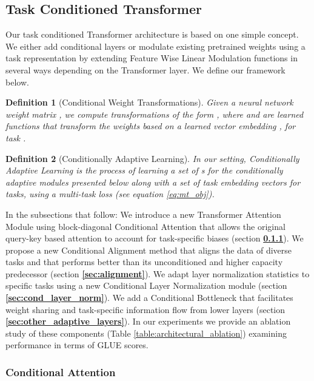 \documentclass{article} \usepackage{iclr2021_conference,times}
\newtheorem{definition}{Definition}
\begin{document}
\subsection{Task Conditioned Transformer}
\label{sec:conditional_transformer}
Our task conditioned Transformer architecture is based on one simple concept. 
We either add conditional layers or modulate existing pretrained weights using a task representation by extending Feature Wise Linear Modulation \citep{Perez2018FiLMVR} functions in several ways depending on the Transformer layer. 
We define our framework below.
\begin{definition}[Conditional Weight Transformations]
Given a neural network weight matrix , we compute transformations of the form , where  and  are learned functions that transform the weights based on a learned vector embedding , for task . 
\end{definition}
\begin{definition}[Conditionally Adaptive Learning]
In our setting, Conditionally Adaptive Learning is the process of learning a set of s for the conditionally adaptive modules presented below along with a set of task embedding vectors  for  tasks, using a 
multi-task loss (see equation \ref{eq:mt_obj}).
\end{definition}
In the subsections that follow:
We introduce a new Transformer Attention Module using block-diagonal Conditional Attention that allows the original query-key based attention to account for task-specific biases (section \textbf{\ref{sec:cond_attn_mat}}). 
We propose a new Conditional Alignment method that aligns the data of diverse tasks and that performs better than its unconditioned and higher capacity predecessor (section \textbf{\ref{sec:alignment}}). We adapt layer normalization statistics to specific tasks using a new Conditional Layer Normalization module (section \textbf{\ref{sec:cond_layer_norm}}). We add a Conditional Bottleneck that facilitates  weight sharing and task-specific information flow from lower layers (section \textbf{\ref{sec:other_adaptive_layers}}). In our experiments we provide an ablation study of these components (Table \ref{table:architectural_ablation}) examining performance in terms of GLUE scores.




\subsubsection{Conditional Attention}
\label{sec:cond_attn_mat}
\end{document}
